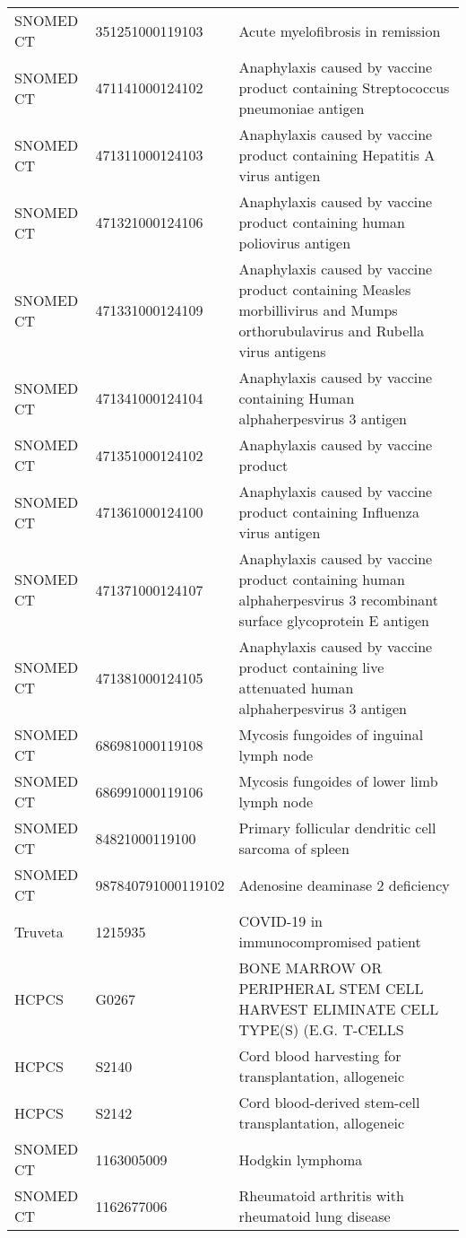 \begin{longtable}{p{}p{}p{}}
  SNOMED CT & 351251000119103 & Acute myelofibrosis in remission \\ 
  SNOMED CT & 471141000124102 & Anaphylaxis caused by vaccine product containing Streptococcus pneumoniae antigen \\ 
  SNOMED CT & 471311000124103 & Anaphylaxis caused by vaccine product containing Hepatitis A virus antigen \\ 
  SNOMED CT & 471321000124106 & Anaphylaxis caused by vaccine product containing human poliovirus antigen \\ 
  SNOMED CT & 471331000124109 & Anaphylaxis caused by vaccine product containing Measles morbillivirus and Mumps orthorubulavirus and Rubella virus antigens \\ 
  SNOMED CT & 471341000124104 & Anaphylaxis caused by vaccine containing Human alphaherpesvirus 3 antigen \\ 
  SNOMED CT & 471351000124102 & Anaphylaxis caused by vaccine product \\ 
  SNOMED CT & 471361000124100 & Anaphylaxis caused by vaccine product containing Influenza virus antigen \\ 
  SNOMED CT & 471371000124107 & Anaphylaxis caused by vaccine product containing human alphaherpesvirus 3 recombinant surface glycoprotein E antigen \\ 
  SNOMED CT & 471381000124105 & Anaphylaxis caused by vaccine product containing live attenuated human alphaherpesvirus 3 antigen \\ 
  SNOMED CT & 686981000119108 & Mycosis fungoides of inguinal lymph node \\ 
  SNOMED CT & 686991000119106 & Mycosis fungoides of lower limb lymph node \\ 
  SNOMED CT & 84821000119100 & Primary follicular dendritic cell sarcoma of spleen \\ 
  SNOMED CT & 987840791000119102 & Adenosine deaminase 2 deficiency \\ 
  Truveta & 1215935 & COVID-19 in immunocompromised patient \\ 
  HCPCS & G0267 & BONE MARROW OR PERIPHERAL STEM CELL HARVEST ELIMINATE CELL TYPE(S) (E.G. T-CELLS \\ 
  HCPCS & S2140 & Cord blood harvesting for transplantation, allogeneic \\ 
  HCPCS & S2142 & Cord blood-derived stem-cell transplantation, allogeneic \\ 
  SNOMED CT & 1163005009 & Hodgkin lymphoma \\ 
  SNOMED CT & 1162677006 & Rheumatoid arthritis with rheumatoid lung disease \\ 

\end{longtable}
